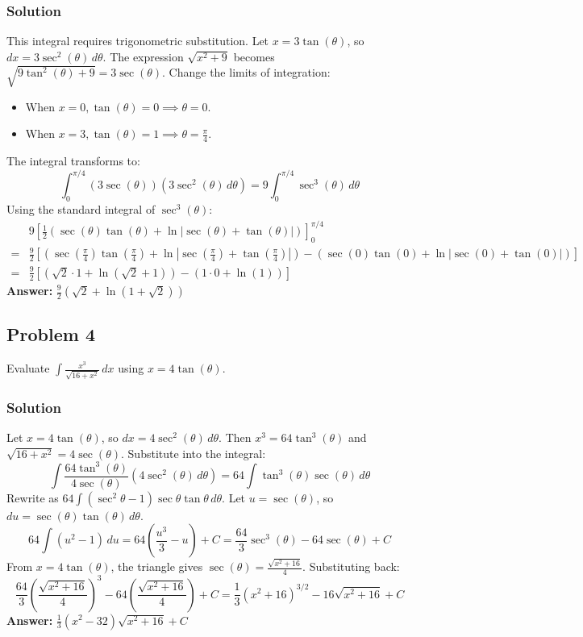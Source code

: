 \documentclass{article}
\begin{document}
\subsubsection*{Solution}
This integral requires trigonometric substitution. Let $ x = 3 \tan(\theta) $, so $ dx = 3 \sec^2(\theta) \,d\theta $.
The expression $ \sqrt{x^2 + 9} $ becomes $ \sqrt{9 \tan^2(\theta) + 9} = 3 \sec(\theta) $.
Change the limits of integration:
\begin{itemize}
    \item When $ x = 0, \tan(\theta) = 0 \implies \theta = 0 $.
    \item When $ x = 3, \tan(\theta) = 1 \implies \theta = \frac{\pi}{4} $.
\end{itemize}
The integral transforms to:
\[ \int_{0}^{\pi/4} (3 \sec(\theta)) (3 \sec^2(\theta) \,d\theta) = 9 \int_{0}^{\pi/4} \sec^3(\theta) \,d\theta \]
Using the standard integral of $ \sec^3(\theta) $:
\begin{align*}
& 9 \left[ \frac{1}{2}(\sec(\theta)\tan(\theta) + \ln|\sec(\theta) + \tan(\theta)|) \right]_{0}^{\pi/4} \\
=& \frac{9}{2} [(\sec(\tfrac{\pi}{4})\tan(\tfrac{\pi}{4}) + \ln|\sec(\tfrac{\pi}{4}) + \tan(\tfrac{\pi}{4})|) - (\sec(0)\tan(0) + \ln|\sec(0) + \tan(0)|)] \\
=& \frac{9}{2} [(\sqrt{2} \cdot 1 + \ln(\sqrt{2} + 1)) - (1 \cdot 0 + \ln(1))]
\end{align*}
\textbf{Answer:} $ \frac{9}{2}(\sqrt{2} + \ln(1 + \sqrt{2})) $


\subsection{Problem 4}
Evaluate $ \int \frac{x^3}{\sqrt{16 + x^2}} \,dx $ using $ x = 4 \tan(\theta) $.
\subsubsection*{Solution}
Let $ x = 4 \tan(\theta) $, so $ dx = 4 \sec^2(\theta) \,d\theta $.
Then $ x^3 = 64 \tan^3(\theta) $ and $ \sqrt{16 + x^2} = 4 \sec(\theta) $.
Substitute into the integral:
\[ \int \frac{64 \tan^3(\theta)}{4 \sec(\theta)} (4 \sec^2(\theta) \,d\theta) = 64 \int \tan^3(\theta)\sec(\theta) \,d\theta \]
Rewrite as $ 64 \int (\sec^2\theta - 1) \sec\theta\tan\theta \,d\theta $. Let $ u = \sec(\theta) $, so $ du = \sec(\theta)\tan(\theta) \,d\theta $.
\[ 64 \int (u^2 - 1) \,du = 64\left(\frac{u^3}{3} - u\right) + C = \frac{64}{3}\sec^3(\theta) - 64\sec(\theta) + C \]
From $ x = 4 \tan(\theta) $, the triangle gives $ \sec(\theta) = \frac{\sqrt{x^2 + 16}}{4} $. Substituting back:
\[ \frac{64}{3}\left(\frac{\sqrt{x^2 + 16}}{4}\right)^3 - 64\left(\frac{\sqrt{x^2 + 16}}{4}\right) + C = \frac{1}{3}(x^2+16)^{3/2} - 16\sqrt{x^2+16} + C \]
\textbf{Answer:} $ \frac{1}{3}(x^2 - 32)\sqrt{x^2 + 16} + C $
\end{document}
